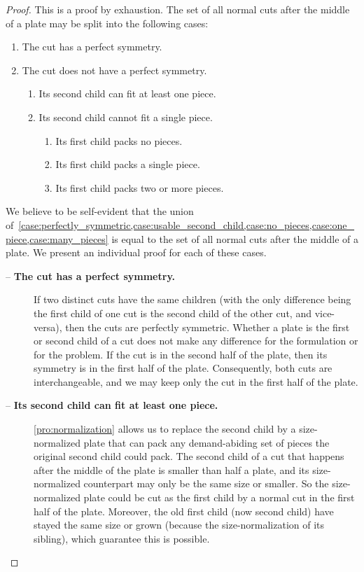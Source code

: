 \documentclass[smallextended]{svjour3}       %
\begin{document}
\begin{proof}
This is a proof by exhaustion. The set of all normal cuts after the middle of a plate may be split into the following cases:
\begin{enumerate}
  \item The cut has a perfect symmetry. \label{case:perfectly_symmetric}
  \item The cut does not have a perfect symmetry.
  \begin{enumerate}
    \item Its second child can fit at least one piece. \label{case:usable_second_child}
    \item Its second child cannot fit a single piece.
    \begin{enumerate}
      \item Its first child packs no pieces. \label{case:no_pieces}
      \item Its first child packs a single piece. \label{case:one_piece} %
      \item Its first child packs two or more pieces. \label{case:many_pieces}
    \end{enumerate}
  \end{enumerate}
\end{enumerate}

We believe to be self-evident that the union of~\cref{case:perfectly_symmetric,case:usable_second_child,case:no_pieces,case:one_piece,case:many_pieces} is equal to the set of all normal cuts after the middle of a plate. We present an individual proof for each of these cases.


\begin{description}
\item[ -- \textbf{The cut has a perfect symmetry.}]
If two distinct cuts have the same children (with the only difference being the first child of one cut is the second child of the other cut, and vice-versa), then the cuts are perfectly symmetric.
Whether a plate is the first or second child of a cut does not make any difference for the formulation or for the problem.
If the cut is in the second half of the plate, then its symmetry is in the first half of the plate.
Consequently, both cuts are interchangeable, and we may keep only the cut in the first half of the plate.
\item[ -- \textbf{Its second child can fit at least one piece.}]
\autoref{pro:normalization} allows us to replace the second child by a size-normalized plate that can pack any demand-abiding set of pieces the original second child could pack.
The second child of a cut that happens after the middle of the plate is smaller than half a plate, and its size-normalized counterpart may only be the same size or smaller.
So the size-normalized plate could be cut as the first child by a normal cut in the first half of the plate.
Moreover, the old first child (now second child) have stayed the same size or grown (because the size-normalization of its sibling), which guarantee this is possible.


\end{description}
\end{proof}
\end{document}
